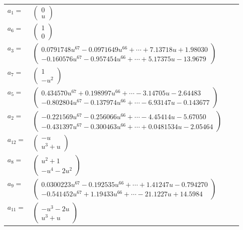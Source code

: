 \documentclass[1p]{elsarticle_modified}
\theoremstyle{definition}
\begin{document}
\begin{tabular}{m{7pt} m{180pt} m{7pt} m{180pt} }
\flushright $a_{1}=$&$\begin{pmatrix}0\\u\end{pmatrix}$ \\
\flushright $a_{6}=$&$\begin{pmatrix}1\\0\end{pmatrix}$ \\
\flushright $a_{3}=$&$\begin{pmatrix}0.0791748 u^{67}-0.0971649 u^{66}+\cdots+7.13718 u+1.98030\\-0.160576 u^{67}-0.957454 u^{66}+\cdots+5.17375 u-13.9679\end{pmatrix}$ \\
\flushright $a_{7}=$&$\begin{pmatrix}1\\- u^2\end{pmatrix}$ \\
\flushright $a_{5}=$&$\begin{pmatrix}0.434570 u^{67}+0.198997 u^{66}+\cdots-3.14705 u-2.64483\\-0.802804 u^{67}-0.137974 u^{66}+\cdots-6.93147 u-0.143677\end{pmatrix}$ \\
\flushright $a_{2}=$&$\begin{pmatrix}-0.221569 u^{67}-0.256066 u^{66}+\cdots-4.45414 u-5.67050\\-0.431397 u^{67}-0.300463 u^{66}+\cdots+0.0481534 u-2.05464\end{pmatrix}$ \\
\flushright $a_{12}=$&$\begin{pmatrix}- u\\u^3+u\end{pmatrix}$ \\
\flushright $a_{8}=$&$\begin{pmatrix}u^2+1\\- u^4-2 u^2\end{pmatrix}$ \\
\flushright $a_{9}=$&$\begin{pmatrix}0.0300223 u^{67}-0.192535 u^{66}+\cdots+1.41247 u-0.794270\\-0.541452 u^{67}+1.19433 u^{66}+\cdots-21.1227 u+14.5984\end{pmatrix}$ \\
\flushright $a_{11}=$&$\begin{pmatrix}- u^3-2 u\\u^3+u\end{pmatrix}$ \\

\end{tabular}
\end{document}
